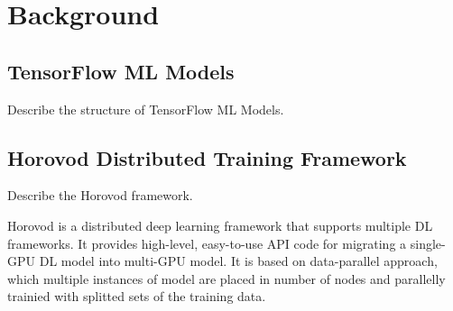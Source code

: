 \section{Background}\label{sec:background}
\subsection{TensorFlow ML Models}
Describe the structure of TensorFlow ML Models.

\subsection{Horovod Distributed Training Framework}
Describe the Horovod framework.

Horovod \cite{sergeev2018horovod} is a distributed deep learning framework
that supports multiple DL frameworks. It provides high-level, easy-to-use API
code for migrating a single-GPU DL model into multi-GPU model.
It is based on data-parallel approach, which multiple instances of
model are placed in number of nodes and parallelly trainied with
splitted sets of the training data.


